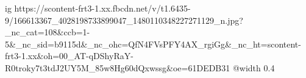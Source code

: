  
 
 
 
 

\ifcmt
  ig https://scontent-frt3-1.xx.fbcdn.net/v/t1.6435-9/166613367_4028198733899047_1480110348227271129_n.jpg?_nc_cat=108&ccb=1-5&_nc_sid=b9115d&_nc_ohc=QfN4FVsPFY4AX_rgiGg&_nc_ht=scontent-frt3-1.xx&oh=00_AT-qDShyRaY-R0troky7t3tdJ2UY5M_85w8Hg60dQxwssg&oe=61DEDB31
  @width 0.4
\fi

